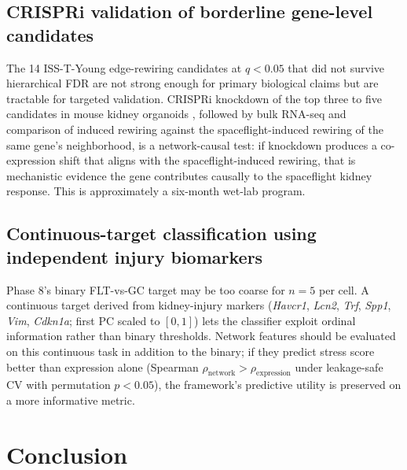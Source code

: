 \documentclass[11pt]{article}
\newcommand{\gene}[1]{\textit{#1}}
\begin{document}
\subsection{CRISPRi validation of borderline gene-level candidates}

The 14 ISS-T-Young edge-rewiring candidates at $q < 0.05$ that did not survive hierarchical FDR are not strong enough for primary biological claims but are tractable for targeted validation. CRISPRi knockdown of the top three to five candidates in mouse kidney organoids \citep{morizane2015nephron}, followed by bulk RNA-seq and comparison of induced rewiring against the spaceflight-induced rewiring of the same gene's neighborhood, is a network-causal test: if knockdown produces a co-expression shift that aligns with the spaceflight-induced rewiring, that is mechanistic evidence the gene contributes causally to the spaceflight kidney response. This is approximately a six-month wet-lab program.

\subsection{Continuous-target classification using independent injury biomarkers}

Phase 8's binary FLT-vs-GC target may be too coarse for $n{=}5$ per cell. A continuous target derived from kidney-injury markers (\gene{Havcr1}, \gene{Lcn2}, \gene{Trf}, \gene{Spp1}, \gene{Vim}, \gene{Cdkn1a}; first PC scaled to $[0,1]$) lets the classifier exploit ordinal information rather than binary thresholds. Network features should be evaluated on this continuous task in addition to the binary; if they predict stress score better than expression alone (Spearman $\rho_{\text{network}} > \rho_{\text{expression}}$ under leakage-safe CV with permutation $p < 0.05$), the framework's predictive utility is preserved on a more informative metric.

\section{Conclusion}
\end{document}
